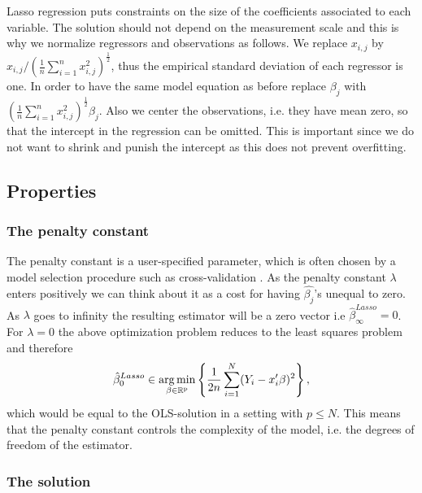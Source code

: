 \documentclass{article}
\theoremstyle{definition}
\DeclareMathOperator*{\argmin}{arg\,min}
\begin{document}
Lasso regression puts constraints on the size of the coefficients associated to each variable. The solution should not depend on the measurement scale and this is why we normalize regressors and observations as follows. We replace $x_{i,j}$ by $x_{i,j}/ (\frac{1}{n} \sum_{i=1}^{n} x_{i,j}^2)^\frac{1}{2}$, thus the empirical standard deviation of each regressor is one. In order to have the same model equation as before replace $\beta_j$ with $(\frac{1}{n}\sum_{i=1}^{n} x_{i,j}^2)^\frac{1}{2} \beta_j$. Also we center the observations, i.e. they have mean zero, so that the intercept in the regression can be omitted. This is important since we do not want to shrink and punish the intercept as this does not prevent overfitting.


\subsection{Properties}

\subsubsection{The penalty constant}

The penalty constant is a user-specified parameter, which is often chosen by a model selection procedure such as cross-validation \citep{sparsity}.
As the penalty constant $\lambda$ enters positively we can think about it as a cost for having $\hat{\beta_j}$'s unequal to zero. As $\lambda$ goes to infinity the resulting estimator will be a zero vector i.e $\hat{\beta}_{\infty}^{Lasso}=0$. For $\lambda=0$ the above optimization problem reduces to the least squares problem and therefore 
\begin{equation}
	\hat{\beta}_{0}^{Lasso}\in\argmin_{\beta \in\rm \mathbb{R}^p} \left  \{ \frac{1}{2n}  \sum_{i=1}^{N}(Y_{i}-x_{i}'\beta)^2\right \},
\end{equation}
which would be equal to the OLS-solution in a setting with $p\leq N$. This means that the penalty constant controls the complexity of the model, i.e. the degrees of freedom of the estimator.

\subsubsection{The solution}
\end{document}
